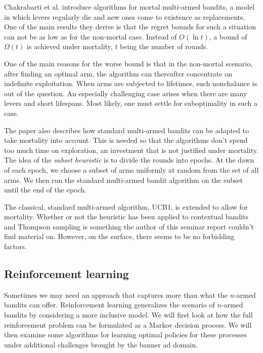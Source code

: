 \documentclass{article} %
\begin{document}
Chakrabarti et al. \cite{chakrabarti2008mortal} introduce algorithms for mortal
multi-armed bandits, a model in which levers regularly die and new ones come to
existence as replacements. One of the main results they derive is that the
regret bounds for such a situation can not be as low as for the non-mortal
case. Instead of $O(\ln t)$, a bound of $\Omega(t)$ is achieved under
mortality, $t$ being the number of rounds.

One of the main reasons for the worse bound is that in the non-mortal scenario,
after finding an optimal arm, the algorithm can thereafter concentrate on
indefinite exploitation. When arms are subjected to lifetimes, such nonchalance
is out of the question.  An especially challenging case arises when there are
many levers and short lifespans. Most likely, one must settle for suboptimality
in such a case.

The paper \cite{chakrabarti2008mortal} also describes how standard multi-armed
bandits can be adapted to take mortality into account. This is needed so that
the algorithms don't spend too much time on exploration, an investment that is
not justified under mortality. The idea of the \emph{subset heuristic} is to
divide the rounds into epochs. At the dawn of each epoch, we choose a subset
of arms uniformly at random from the set of all arms. We then run the standard
multi-armed bandit algorithm on the subset until the end of the epoch.

The classical, standard multi-armed algorithm, UCB1, is extended to allow for
mortality. Whether or not the heuristic has been applied to contextual bandits
and Thompson sampling is something the author of this seminar report couldn't
find material on. However, on the surface, there seems to be no forbidding
factors.




\subsection{Reinforcement learning}

Sometimes we may need an approach that captures more than what the $n$-armed
bandits can offer. Reinforcement learning generalizes the scenario of $n$-armed
bandits by considering a more inclusive model. We will first look at how the
full reinforcement problem can be formulated as a Markov decision process. We
will then examine some algorithms for learning optimal policies for these
processes under additional challenges brought by the banner ad domain.
\end{document}
